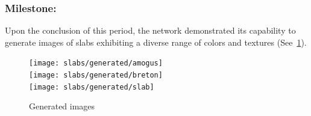 \subsubsection{Milestone:}
Upon the conclusion of this period, the network demonstrated its capability to generate images of slabs exhibiting a diverse range of colors and textures (See~\ref*{fig:gen-images}).
\begin{figure}
    \centering
    \texttt{[image: slabs/generated/amogus]}
    \\
    \texttt{[image: slabs/generated/breton]}
    \\
    \texttt{[image: slabs/generated/slab]}
    \caption{Generated images}\label{fig:gen-images}
\end{figure}